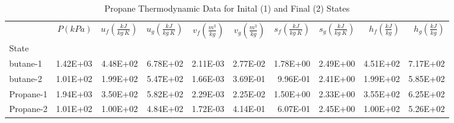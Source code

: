 \documentclass[10pt,parskip=half,
toc=sectionentrywithdots,
bibliography=totocnumbered,
captions=tableheading,numbers=noendperiod]{scrartcl}
\begin{document}
\begin{table}[H]
\caption{Propane Thermodynamic Data for Inital (1) and Final (2) States}\label{tbl:thermo}
\centering
\begin{adjustbox}{max width=\textwidth}
\begin{tabular}{lrrrrrrrrr}
\toprule
{} &  $P \left(kPa\right)$ &  $u_f \left(\frac{kJ}{kg\:K}\right)$ &  $u_g \left(\frac{kJ}{kg\:K}\right)$ &  $v_f \left(\frac{m^3}{kg}\right)$ &  $v_g \left(\frac{m^3}{kg}\right)$ &  $s_f \left(\frac{kJ}{kg\:K}\right)$ &  $s_g \left(\frac{kJ}{kg\:K}\right)$ &  $h_f \left(\frac{kJ}{kg}\right)$ &  $h_g \left(\frac{kJ}{kg}\right)$ \\
State     &                       &                                      &                                      &                                    &                                    &                                      &                                      &                                   &                                   \\
\midrule
butane-1  &              1.42E+03 &                             4.48E+02 &                             6.78E+02 &                           2.11E-03 &                           2.77E-02 &                             1.78E+00 &                             2.49E+00 &                          4.51E+02 &                          7.17E+02 \\
butane-2  &              1.01E+02 &                             1.99E+02 &                             5.47E+02 &                           1.66E-03 &                           3.69E-01 &                             9.96E-01 &                             2.41E+00 &                          1.99E+02 &                          5.85E+02 \\
Propane-1 &              1.94E+03 &                             3.50E+02 &                             5.82E+02 &                           2.29E-03 &                           2.25E-02 &                             1.50E+00 &                             2.33E+00 &                          3.55E+02 &                          6.25E+02 \\
Propane-2 &              1.01E+02 &                             1.00E+02 &                             4.84E+02 &                           1.72E-03 &                           4.14E-01 &                             6.07E-01 &                             2.45E+00 &                          1.00E+02 &                          5.26E+02 \\
\bottomrule
\end{tabular}

\end{adjustbox}
\end{table}
\end{document}
